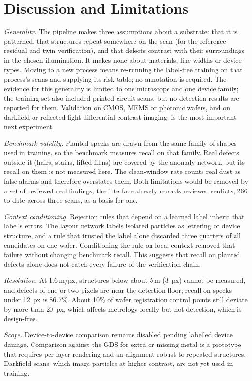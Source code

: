 \documentclass[journal]{IEEEtran}
\newcommand{\um}{\,\textmu m}
\newcommand{\umpx}{\,\textmu m/px}
\begin{document}
\section{Discussion and Limitations}\label{sec:discussion}
\emph{Generality.} The pipeline makes three assumptions about a substrate: that it is patterned, that structures repeat somewhere on the scan (for the reference residual and twin verification), and that defects contrast with their surroundings in the chosen illumination. It makes none about materials, line widths or device types. Moving to a new process means re-running the label-free training on that process's scans and supplying its risk table; no annotation is required. The evidence for this generality is limited to one microscope and one device family; the training set also included printed-circuit scans, but no detection results are reported for them. Validation on CMOS, MEMS or photonic wafers, and on darkfield or reflected-light differential-contrast imaging, is the most important next experiment.

\emph{Benchmark validity.} Planted specks are drawn from the same family of shapes used in training, so the benchmark measures recall on that family. Real defects outside it (hairs, stains, lifted films) are covered by the anomaly network, but its recall on them is not measured here. The clean-window rate counts real dust as false alarms and therefore overstates them. Both limitations would be removed by a set of reviewed real findings; the interface already records reviewer verdicts, 266 to date across three scans, as a basis for one.

\emph{Context conditioning.} Rejection rules that depend on a learned label inherit that label's errors. The layout network labels isolated particles as lettering or device structure, and a rule that trusted the label alone discarded three quarters of all candidates on one wafer. Conditioning the rule on local context removed that failure without changing benchmark recall. This suggests that recall on planted defects alone does not catch every failure of the verification chain.

\emph{Resolution.} At 1.6\umpx, structures below about 5\um{} (3~px) cannot be measured, and defects of one or two pixels are near the detection floor; recall on specks under 12~px is 86.7\%. About 10\% of wafer registration control points still deviate by more than 20~px, which affects metrology locally but not detection, which is design-free.

\emph{Scope.} Device-to-device comparison remains disabled pending labelled device damage. Comparison against the GDS for extra or missing metal is a prototype that requires per-layer rendering and an alignment robust to repeated structures. Darkfield scans, which image particles at higher contrast, are not yet used in training.
\end{document}
